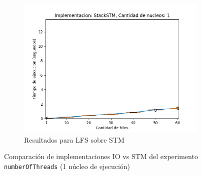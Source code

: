 \begin{appendices}
\begin{figure}[H]
\begin{subfigure}[b]{0.49\textwidth}
    \end{subfigure}
    \begin{subfigure}[b]{0.49\textwidth}
        \includegraphics[width=\textwidth]{images/numberOfThreads/plots/expStackSTM-1}
        \caption{Resultados para LFS sobre STM}
        \label{subfig:numberOfThreads-stackstm-1}
    \end{subfigure}
    \caption{Comparación de implementaciones IO vs STM del experimento \texttt{numberOfThreads} (1 núcleo de ejecución)}
    \label{fig:numberOfThreads-boxplots-1}
\end{figure}


\end{appendices}
